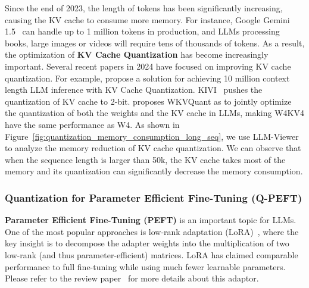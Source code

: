Since the end of 2023, the length of tokens has been significantly increasing, causing the KV cache to consume more memory. 
For instance, Google Gemini 1.5~\citep{gemini2024} can handle up to 1 million tokens in production, and LLMs processing books, large images or videos will require tens of thousands of tokens. As a result, the optimization of \textbf{KV Cache Quantization} has become increasingly important. 
Several recent papers in 2024 have focused on improving KV cache quantization. 
For example, \cite{hooper2024kvquant} propose a solution for achieving 10 million context length LLM inference with KV Cache Quantization.
KIVI~\citep{liu2024kivi} pushes the quantization of KV cache to 2-bit.
\cite{yue2024wkvquant} proposes WKVQuant as to jointly optimize the quantization of both the weights and the KV cache in LLMs, making W4KV4 have the same performance as W4.
As shown in Figure~\ref{fig:quantization_memory_consumption_long_seq}, we use LLM-Viewer to analyze the memory reduction of KV cache quantization.
We can observe that when the sequence length is larger than 50k, the KV cache takes most of the memory and its quantization can significantly decrease the memory consumption.



\subsubsection{Quantization for Parameter Efficient Fine-Tuning (Q-PEFT)}

\textbf{Parameter Efficient Fine-Tuning (PEFT)} is an important topic for LLMs. One of the most popular approaches is low-rank adaptation (LoRA)~\citep{hu2021lora,valipour2022dylora}, where the key insight is to decompose the adapter weights into the multiplication of two low-rank (and thus parameter-efficient) matrices. 
LoRA has claimed comparable performance to full fine-tuning while using much fewer learnable parameters. 
Please refer to the review paper~\citep{hu2023llm} for more details about this adaptor. 

